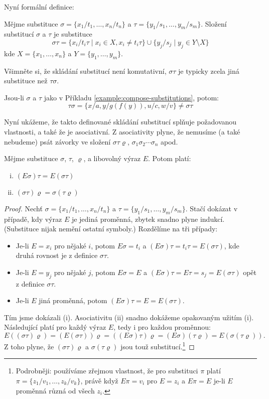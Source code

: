 Nyní formální definice:

\begin{definition}
Mějme substituce $\sigma=\{x_1/t_1,\dots,x_n/t_n\}$ a $\tau=\{y_1/s_1,\dots,y_m/s_m\}$. \alert{Složení substitucí $\sigma$ a $\tau$} je substituce
$$
\sigma\tau=\{x_i/t_i\tau\mid x_i\in X,x_i\neq t_i\tau\}\cup\{y_j/s_j\mid y_j\in Y\setminus X\}
$$
kde $X=\{x_1,\dots,x_n\}$ a $Y=\{y_1,\dots,y_m\}$.
\end{definition}

Všimněte si, že skládání substitucí není komutativní, $\sigma\tau$ je typicky zcela jiná substituce než $\tau\sigma$.

\begin{example}
    Jsou-li $\sigma$ a $\tau$ jako v Příkladu \ref{example:compose-substitutions}, potom: 
    $$
    \tau\sigma=\{x/a,y/g(f(y)),u/c,w/v\}\neq \sigma\tau
    $$
\end{example}

Nyní ukážeme, že takto definované skládání substitucí splňuje požadovanou vlastnosti, a také že je \alert{asociativní}. Z asociativity plyne, že nemusíme (a také nebudeme) psát závorky ve složení $\sigma\tau\varrho$, $\sigma_1\sigma_2\cdots\sigma_n$ apod.

\begin{proposition}
Mějme substituce $\sigma$, $\tau$, $\varrho$, a libovolný výraz $E$. Potom platí:
\begin{enumerate}[(i)]
    \item $(E\sigma)\tau=E(\sigma\tau)$
    \item $(\sigma\tau)\varrho=\sigma(\tau\varrho)$
\end{enumerate}
\end{proposition}

\begin{proof}
Nechť $\sigma=\{x_1/t_1,\dots,x_n/t_n\}$ a $\tau=\{y_1/s_1,\dots,y_m/s_m\}$. Stačí dokázat v případě, kdy výraz $E$ je jediná proměnná, zbytek snadno plyne indukcí. (Substituce nijak nemění ostatní symboly.) Rozdělíme na tři případy:
\begin{itemize}
    \item Je-li $E=x_i$ pro nějaké $i$, potom $E\sigma=t_i$ a $(E\sigma)\tau=t_i\tau=E(\sigma\tau)$, kde druhá rovnost je z definice $\sigma\tau$.
    \item Je-li $E=y_j$ pro nějaké $j$, potom $E\sigma=E$ a $(E\sigma)\tau=E\tau=s_j=E(\sigma\tau)$ opět z definice $\sigma\tau$.
    \item Je-li $E$ jiná proměnná, potom $(E\sigma)\tau=E=E(\sigma\tau)$.
\end{itemize}
Tím jsme dokázali (i). Asociativitu (ii) snadno dokážeme opakovaným užitím (i). Následující platí pro každý výraz $E$, tedy i pro každou proměnnou:
$$
E((\sigma\tau)\varrho)=(E(\sigma\tau))\varrho=((E\sigma)\tau)\varrho=(E\sigma)(\tau\varrho)=E(\sigma(\tau\varrho)).
$$
Z toho plyne, že $(\sigma\tau)\varrho$ a $\sigma(\tau\varrho)$ jsou touž substitucí.\footnote{Podrobněji: používáme zřejmou vlastnost, že pro substituci $\pi$ platí $\pi=\{z_1/v_1,\dots,z_k/v_k\}$, právě když $E\pi=v_i$ pro $E=z_i$  a $E\pi=E$ je-li $E$ proměnná různá od všech $z_i$.}
\end{proof}    

